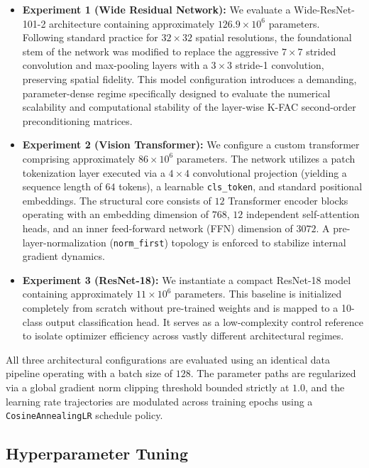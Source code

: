 \documentclass[conference]{IEEEtran}
\begin{document}
\begin{itemize}
    \item \textbf{Experiment 1 (Wide Residual Network):} We evaluate a Wide-ResNet-101-2 architecture containing approximately $126.9\times 10^6$ parameters. Following standard practice for $32 \times 32$ spatial resolutions, the foundational stem of the network was modified to replace the aggressive $7 \times 7$ strided convolution and max-pooling layers with a $3 \times 3$ stride-1 convolution, preserving spatial fidelity. This model configuration introduces a demanding, parameter-dense regime specifically designed to evaluate the numerical scalability and computational stability of the layer-wise K-FAC second-order preconditioning matrices.
    
    \item \textbf{Experiment 2 (Vision Transformer):} We configure a custom transformer comprising approximately $86\times 10^6$ parameters. The network utilizes a patch tokenization layer executed via a $4\times 4$ convolutional projection (yielding a sequence length of $64$ tokens), a learnable \texttt{cls\_token}, and standard positional embeddings. The structural core consists of $12$ Transformer encoder blocks operating with an embedding dimension of $768$, $12$ independent self-attention heads, and an inner feed-forward network (FFN) dimension of $3072$. A pre-layer-normalization (\texttt{norm\_first}) topology is enforced to stabilize internal gradient dynamics.
    
    \item \textbf{Experiment 3 (ResNet-18):} We instantiate a compact ResNet-18 model containing approximately $11\times 10^6$ parameters. This baseline is initialized completely from scratch without pre-trained weights and is mapped to a 10-class output classification head. It serves as a low-complexity control reference to isolate optimizer efficiency across vastly different architectural regimes.
\end{itemize}

All three architectural configurations are evaluated using an identical data pipeline operating with a batch size of $128$. The parameter paths are regularized via a global gradient norm clipping threshold bounded strictly at $1.0$, and the learning rate trajectories are modulated across training epochs using a \texttt{CosineAnnealingLR} schedule policy.

\subsection{Hyperparameter Tuning}
\end{document}
